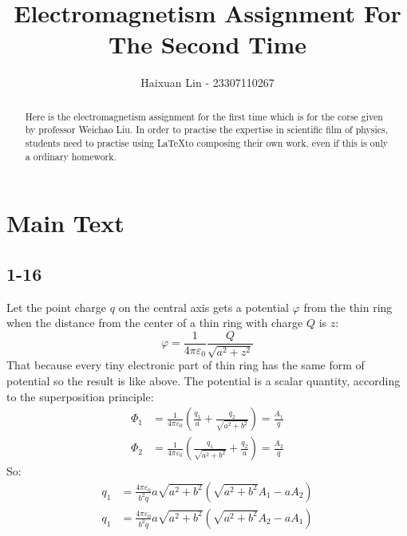 \documentclass[a4paper,11pt]{amsart}
\title{Electromagnetism Assignment For The Second Time}
\author{Haixuan Lin - 23307110267}
\theoremstyle{definition}
\begin{document}
	
	\begin{abstract}
		Here is the electromagnetism assignment for the first time which is for the corse given by professor Weichao Liu. In order to practise the expertise in scientific film of physics, students need to practise using \LaTeX to composing their own work, even if this is only a ordinary homework.
	\end{abstract}
	
	\maketitle
	\section*{Main Text}
	\subsection*{1-16}
	Let the point charge $q$ on the central axis gets a potential $\varphi$ from the thin ring when the distance from the center of a thin ring with charge $Q$ is $z$:
	\begin{equation*}
		\varphi=\frac{1}{4\pi \varepsilon _0}\frac{Q}{\sqrt{a^2+z^2}}
	\end{equation*}
	That because every tiny electronic part of thin ring has the same form of potential so the result is like above.
	The potential is a scalar quantity, according to the superposition principle:
	\begin{align*}
		\varPhi _1&=\frac{1}{4\pi \varepsilon _0}\left( \frac{q_1}{a}+\frac{q_2}{\sqrt{a^2+b^2}} \right)=\frac{A_1}{q}
		\\
		\varPhi _2&=\frac{1}{4\pi \varepsilon _0}\left( \frac{q_1}{\sqrt{a^2+b^2}}+\frac{q_2}{a} \right) =\frac{A_2}{q}
	\end{align*}
	So:
	\begin{align*}
		q_1&=\frac{4\pi \varepsilon _0}{b^2q}a\sqrt{a^2+b^2}\left( \sqrt{a^2+b^2}A_1-aA_2 \right) 
		\\
		q_1&=\frac{4\pi \varepsilon _0}{b^2q}a\sqrt{a^2+b^2}\left( \sqrt{a^2+b^2}A_2-aA_1 \right) 
	\end{align*}
	
	
\end{document}
